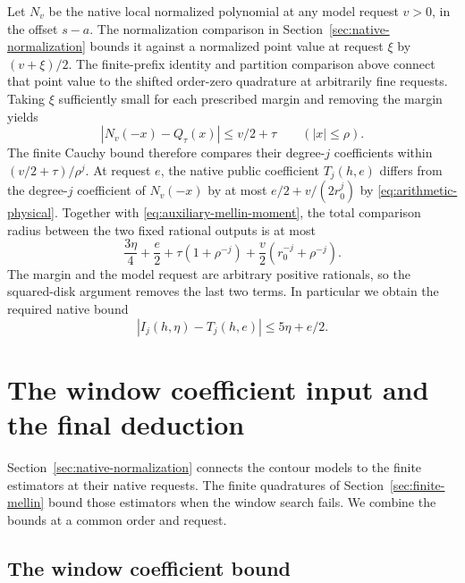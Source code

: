 \documentclass[11pt]{amsart}
\theoremstyle{definition}
\theoremstyle{remark}
\numberwithin{equation}{section}
\begin{document}
Let \(N_v\) be the native local normalized polynomial
at any model request \(v>0\), in the offset \(s-a\).
The normalization comparison in
Section~\ref{sec:native-normalization} bounds it
against a normalized point value at request \(\xi\)
by \((v+\xi)/2\).
The finite-prefix identity and partition comparison
above connect that point value to the shifted
order-zero quadrature at arbitrarily fine requests.
Taking \(\xi\) sufficiently small for each prescribed
margin and removing the margin yields
\[
          |N_v(-x)-Q_\tau(x)|\le v/2+\tau
                              \qquad(|x|\le\rho).
\]
The finite Cauchy bound therefore compares their
degree-\(j\) coefficients within
\((v/2+\tau)/\rho^j\).
At request \(e\), the native public coefficient
\(T_j(h,e)\) differs from the degree-\(j\) coefficient
of \(N_v(-x)\) by at most \(e/2+v/(2r_0^j)\) by
\eqref{eq:arithmetic-physical}.
Together with \eqref{eq:auxiliary-mellin-moment}, the
total comparison radius between the two fixed rational
outputs is at most
\[
       \frac{3\eta}4+\frac e2+
         \tau(1+\rho^{-j})+\frac v2(r_0^{-j}+\rho^{-j}).
\]
The margin and the model request are arbitrary positive
rationals, so the squared-disk argument removes the
last two terms. In particular we obtain the required
native bound
\begin{equation}\label{eq:proved-mellin-moment}
                 |I_j(h,\eta)-T_j(h,e)|\le 5\eta+e/2 .
\end{equation}

\section{The window coefficient input and the final deduction}
\label{sec:composition}

Section~\ref{sec:native-normalization} connects the contour
models to the finite estimators at their native requests.
The finite quadratures of Section~\ref{sec:finite-mellin}
bound those estimators when the window search fails.
We combine the bounds at a common order and request.

\subsection{The window coefficient bound}
\label{sec:window-estimate}
\end{document}
